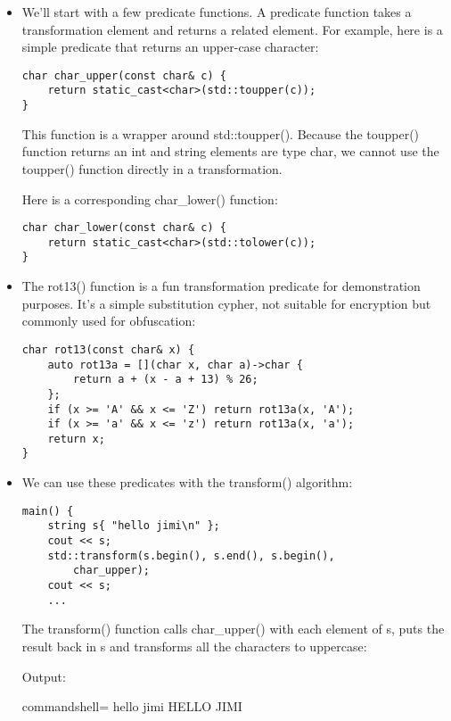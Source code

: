 \begin{itemize}
\item 
We'll start with a few predicate functions. A predicate function takes a transformation element and returns a related element. For example, here is a simple predicate that returns an upper-case character:

\begin{lstlisting}[style=styleCXX]
char char_upper(const char& c) {
	return static_cast<char>(std::toupper(c));
}
\end{lstlisting}

This function is a wrapper around std::toupper(). Because the toupper() function returns an int and string elements are type char, we cannot use the toupper() function directly in a transformation.

Here is a corresponding char\_lower() function:

\begin{lstlisting}[style=styleCXX]
char char_lower(const char& c) {
	return static_cast<char>(std::tolower(c));
}
\end{lstlisting}

\item 
The rot13() function is a fun transformation predicate for demonstration purposes. It's a simple substitution cypher, not suitable for encryption but commonly used for obfuscation:

\begin{lstlisting}[style=styleCXX]
char rot13(const char& x) {
	auto rot13a = [](char x, char a)->char {
		return a + (x - a + 13) % 26;
	};
	if (x >= 'A' && x <= 'Z') return rot13a(x, 'A');
	if (x >= 'a' && x <= 'z') return rot13a(x, 'a');
	return x;
}
\end{lstlisting}

\item 
We can use these predicates with the transform() algorithm:

\begin{lstlisting}[style=styleCXX]
main() {
	string s{ "hello jimi\n" };
	cout << s;
	std::transform(s.begin(), s.end(), s.begin(),
		char_upper);
	cout << s;
	...
\end{lstlisting}

The transform() function calls char\_upper() with each element of s, puts the result back in s and transforms all the characters to uppercase: 

Output:

\begin{tcblisting}{commandshell={}}
hello jimi
HELLO JIMI
\end{tcblisting}


\end{itemize}
